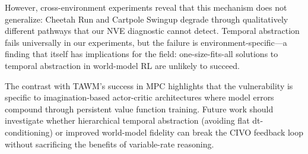 \documentclass[10pt,letterpaper]{article}
\begin{document}
However, cross-environment experiments reveal that this mechanism does not generalize: Cheetah Run and Cartpole Swingup degrade through qualitatively different pathways that our NVE diagnostic cannot detect. Temporal abstraction fails universally in our experiments, but the failure is environment-specific---a finding that itself has implications for the field: one-size-fits-all solutions to temporal abstraction in world-model RL are unlikely to succeed.

The contrast with TAWM's success in MPC highlights that the vulnerability is specific to imagination-based actor-critic architectures where model errors compound through persistent value function training. Future work should investigate whether hierarchical temporal abstraction (avoiding flat dt-conditioning) or improved world-model fidelity can break the CIVO feedback loop without sacrificing the benefits of variable-rate reasoning.
\end{document}

